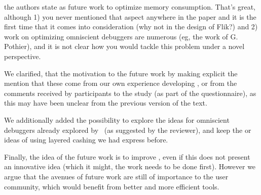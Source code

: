 \begin{remark}
the authors state as future work to optimize memory consumption. That's great, although 1) you never mentioned that aspect anywhere in the paper and it is the first time that it comes into consideration (why not in the design of Flik?) and 2) work on optimizing omniscient debuggers are numerous (eg, the work of G. Pothier), and it is not clear how you would tackle this problem under a novel perspective.
\end{remark}
\begin{solved}
We clarified, that the motivation to the future work by making explicit the mention that these come from our own experience developing \flik, or from the comments received by participants to the study (as part of the questionnaire), as this may have been unclear from the previous version of the text.

We additionally added the possibility to explore the ideas for omniscient debuggers already explored by~\citet{pothier07} (as suggested by the reviewer), and keep the or ideas of using layered cashing we had express before.

Finally, the idea of the future work is to improve \flik, even if this does not present an innovative idea (which it might, the work needs to be done first). However we argue that the avenues of future work are still of importance to the user community, which would benefit from better and more efficient tools.
\end{solved}


\endinput
